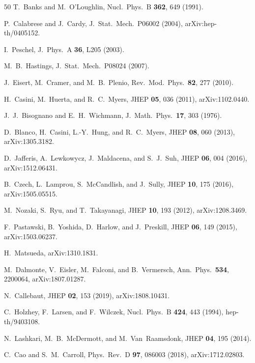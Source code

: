 \documentclass[aps,prd,twocolumn,superscriptaddress,nofootinbib,floatfix]{revtex4-2}
\begin{document}
\begin{thebibliography}{50}
T.~Banks and M.~O'Loughlin, Nucl.\ Phys.\ B \textbf{362}, 649 (1991).

P.~Calabrese and J.~Cardy, J.\ Stat.\ Mech.\ P06002 (2004), arXiv:hep-th/0405152.

I.~Peschel, J.\ Phys.\ A \textbf{36}, L205 (2003).

M.~B.~Hastings, J.\ Stat.\ Mech.\ P08024 (2007).

J.~Eisert, M.~Cramer, and M.~B.~Plenio, Rev.\ Mod.\ Phys.\ \textbf{82}, 277 (2010).

H.~Casini, M.~Huerta, and R.~C.~Myers, JHEP \textbf{05}, 036 (2011), arXiv:1102.0440.

J.~J.~Bisognano and E.~H.~Wichmann, J.\ Math.\ Phys.\ \textbf{17}, 303 (1976).

D.~Blanco, H.~Casini, L.-Y.~Hung, and R.~C.~Myers, JHEP \textbf{08}, 060 (2013), arXiv:1305.3182.

D.~Jafferis, A.~Lewkowycz, J.~Maldacena, and S.~J.~Suh, JHEP \textbf{06}, 004 (2016), arXiv:1512.06431.

B.~Czech, L.~Lamprou, S.~McCandlish, and J.~Sully, JHEP \textbf{10}, 175 (2016), arXiv:1505.05515.

M.~Nozaki, S.~Ryu, and T.~Takayanagi, JHEP \textbf{10}, 193 (2012), arXiv:1208.3469.

F.~Pastawski, B.~Yoshida, D.~Harlow, and J.~Preskill, JHEP \textbf{06}, 149 (2015), arXiv:1503.06237.

H.~Matsueda, arXiv:1310.1831.

M.~Dalmonte, V.~Eisler, M.~Falconi, and B.~Vermersch, Ann.\ Phys.\ \textbf{534}, 2200064, arXiv:1807.01287.

N.~Callebaut, JHEP \textbf{02}, 153 (2019), arXiv:1808.10431.

C.~Holzhey, F.~Larsen, and F.~Wilczek, Nucl.\ Phys.\ B \textbf{424}, 443 (1994), hep-th/9403108.

N.~Lashkari, M.~B.~McDermott, and M.~Van~Raamsdonk, JHEP \textbf{04}, 195 (2014).

C.~Cao and S.~M.~Carroll, Phys.\ Rev.\ D \textbf{97}, 086003 (2018), arXiv:1712.02803.


\end{thebibliography}
\end{document}
